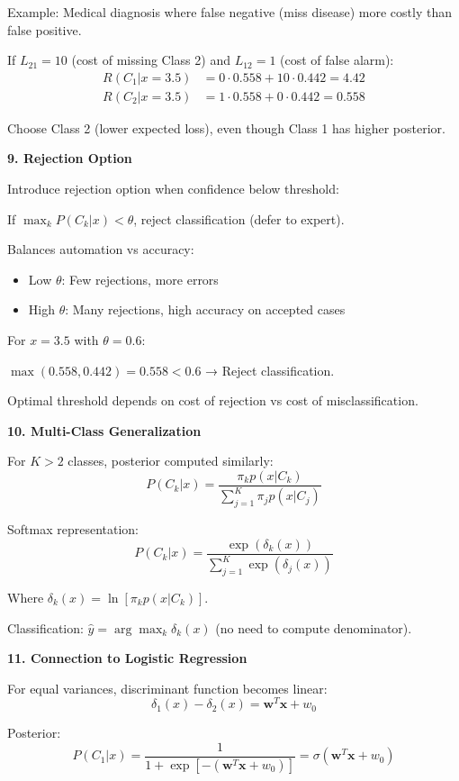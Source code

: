 \documentclass[12pt]{article}
\begin{document}
\begin{explanation}
Example: Medical diagnosis where false negative (miss disease) more costly than false positive.

If $L_{21} = 10$ (cost of missing Class 2) and $L_{12} = 1$ (cost of false alarm):
\begin{align*}
R(C_1|x = 3.5) &= 0 \cdot 0.558 + 10 \cdot 0.442 = 4.42 \\
R(C_2|x = 3.5) &= 1 \cdot 0.558 + 0 \cdot 0.442 = 0.558
\end{align*}

Choose Class 2 (lower expected loss), even though Class 1 has higher posterior.

\textbf{9. Rejection Option}

Introduce rejection option when confidence below threshold:

If $\max_k P(C_k|x) < \theta$, reject classification (defer to expert).

Balances automation vs accuracy:
\begin{itemize}
\item Low $\theta$: Few rejections, more errors
\item High $\theta$: Many rejections, high accuracy on accepted cases
\end{itemize}

For $x = 3.5$ with $\theta = 0.6$:

$\max(0.558, 0.442) = 0.558 < 0.6$ → Reject classification.

Optimal threshold depends on cost of rejection vs cost of misclassification.

\textbf{10. Multi-Class Generalization}

For $K > 2$ classes, posterior computed similarly:
\[P(C_k|x) = \frac{\pi_k p(x|C_k)}{\sum_{j=1}^K \pi_j p(x|C_j)}\]

Softmax representation:
\[P(C_k|x) = \frac{\exp(\delta_k(x))}{\sum_{j=1}^K \exp(\delta_j(x))}\]

Where $\delta_k(x) = \ln[\pi_k p(x|C_k)]$.

Classification: $\hat{y} = \arg\max_k \delta_k(x)$ (no need to compute denominator).

\textbf{11. Connection to Logistic Regression}

For equal variances, discriminant function becomes linear:
\[\delta_1(x) - \delta_2(x) = \mathbf{w}^T \mathbf{x} + w_0\]

Posterior:
\[P(C_1|x) = \frac{1}{1 + \exp[-(\mathbf{w}^T \mathbf{x} + w_0)]} = \sigma(\mathbf{w}^T \mathbf{x} + w_0)\]


\end{explanation}
\end{document}
